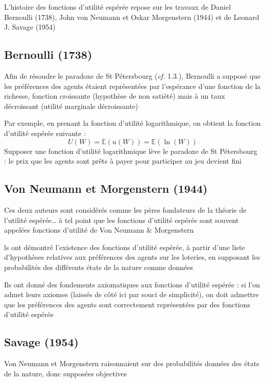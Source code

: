 \documentclass[a4paper, 12pt]{report}
\begin{document}
L'histoire des fonctions d'utilité espérée repose sur les
travaux de Daniel Bernoulli (1738), John von Neumann et Oskar Morgenstern (1944) et de Leonard J. Savage (1954)

\subsection{Bernoulli (1738)}

Afin de résoudre le paradoxe de St Pétersbourg (\textit{cf.} 1.3.), Bernoulli a supposé que les préférences des agents étaient représentées par l'espérance d'une fonction de la richesse, fonction croissante (hypothèse de non satiété) mais à un taux décroissant (utilité marginale décroissante)

Par exemple, en prenant la fonction d'utilité logarithmique, on obtient la fonction d'utilité espérée suivante :
$$
U(W)=\mathbb{E}\left( u(W)\right)=\mathbb{E}\left( \ln(W) \right)
$$
Supposer une fonction d'utilité logarithmique lève le paradoxe de St Pétersbourg : le prix que les agents sont prêts à payer pour participer au jeu devient fini

\subsection{Von Neumann et Morgenstern (1944)}

Ces deux auteurs sont considérés comme les pères fondateurs de la théorie de l'utilité espérée… à tel point que les fonctions d'utilité espérée sont souvent appelées fonctions d'utilité de Von Neumann \& Morgenstern

ls ont démontré l'existence des fonctions d'utilité espérée, à partir d'une liste d'hypothèses relatives aux préférences des agents sur les loteries, en supposant les probabilités des différents états de la nature comme données

Ils ont donné des fondements axiomatiques aux fonctions d'utilité espérée : si l'on admet leurs axiomes (laissés de côté ici par souci de simplicité), on doit admettre que les préférences des agents sont correctement représentées par des fonctions d'utilité espérée

\subsection{Savage (1954)}

Von Neumann et Morgenstern raisonnaient sur des probabilités données des états de la nature, donc supposées objectives
\end{document}
